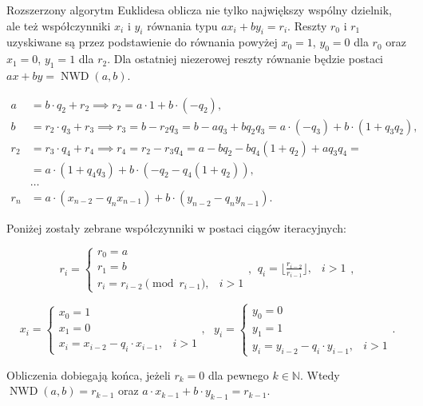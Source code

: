 \documentclass[12pt,twoside,a4]{mwbk}
\theoremstyle{definition}
\DeclareMathOperator{\NWD}{NWD}
\begin{document}
Rozszerzony algorytm Euklidesa oblicza nie tylko największy wspólny dzielnik, ale też współczynniki $x_i$ i $y_i$ równania typu $ax_i + by_i = r_i$. Reszty $r_0$ i $r_1$ uzyskiwane są przez podstawienie do równania powyżej $x_0 = 1$, $y_0 = 0$ dla $r_0$ oraz $x_1 = 0$, $y_1 = 1$ dla $r_2$. Dla ostatniej niezerowej reszty równanie będzie postaci $ax + by = \NWD(a,b)$.

\begin{equation*} \begin{aligned}
a &= b \cdot q_2 + r_2  \implies r_2 = a \cdot 1 + b \cdot (-q_2), \\
b &= r_2 \cdot q_3 + r_3 \implies r_3 = b - r_2 q_3 = b - a q_3 + b q_2 q_3 = a \cdot (-q_3) + b \cdot (1 + q_3 q _2), \\
r_2 &= r_3 \cdot q_4 + r_4 \implies r_4 = r_2 - r_3 q_4 = a - b q_2 - b q_4 (1 + q_2) + a q_3 q_4 = \\
&= a \cdot (1 + q_4 q_3) + b \cdot (-q_2 - q_4 (1 + q_2)), \\
& \ldots \\
r_n &= a \cdot (x_{n-2} - q_n x_{n-1}) + b \cdot (y_{n-2} - q_n y_{n-1}).
\end{aligned} \end{equation*}

Poniżej zostały zebrane współczynniki w postaci ciągów iteracyjnych:

\[ r_i = \left\{ \begin{array}{lc} r_0 = a \\ r_1 = b \\ r_i = r_{i-2} \pmod{r_{i-1}},& i > 1 \end{array} \right. ,
\begin{array}{lc} q_i = \lfloor \frac{r_{i-2}}{r_{i-1}} \rfloor ,& i>1 \end{array}, \]

\[
x_i = \left\{ \begin{array}{lc} x_0 = 1 \\ x_1 = 0 \\ x_i = x_{i-2} - q_{i} \cdot x_{i-1} ,& i > 1 \end{array} \right. ,\text{ }
y_i = \left\{ \begin{array}{lc} y_0 = 0 \\ y_1 = 1 \\ y_i = y_{i-2} - q_i \cdot y_{i-1} ,& i > 1 \end{array} \right. .
\]

Obliczenia dobiegają końca, jeżeli $r_k = 0$ dla pewnego $k\in\mathbb{N}$. Wtedy $\NWD(a,b) = r_{k-1}$ oraz $a \cdot x_{k-1} + b \cdot y_{k-1} = r_{k-1}$.
\end{document}
